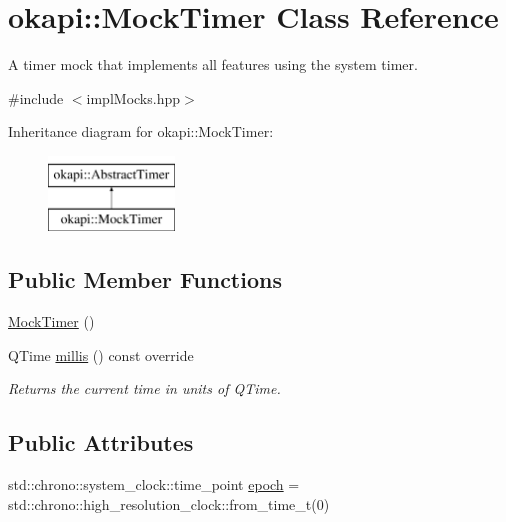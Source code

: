 \hypertarget{classokapi_1_1MockTimer}{}\section{okapi\+::Mock\+Timer Class Reference}
\label{classokapi_1_1MockTimer}


A timer mock that implements all features using the system timer.  




{\ttfamily \#include $<$impl\+Mocks.\+hpp$>$}

Inheritance diagram for okapi\+::Mock\+Timer\+:\begin{figure}[H]
\begin{center}
\leavevmode
\includegraphics[height=2.000000cm]{classokapi_1_1MockTimer}
\end{center}
\end{figure}
\subsection*{Public Member Functions}
\begin{DoxyCompactItemize}
\item 
\mbox{\hyperlink{classokapi_1_1MockTimer_af9912c6f000085eb60b57982da81d787}{Mock\+Timer}} ()
\item 
Q\+Time \mbox{\hyperlink{classokapi_1_1MockTimer_a8e688820e2fc7c4ec0e86bf9b837bf20}{millis}} () const override
\begin{DoxyCompactList}\small\item\em Returns the current time in units of Q\+Time. \end{DoxyCompactList}\end{DoxyCompactItemize}
\subsection*{Public Attributes}
\begin{DoxyCompactItemize}
\item 
std\+::chrono\+::system\+\_\+clock\+::time\+\_\+point \mbox{\hyperlink{classokapi_1_1MockTimer_a43cd4e080867a28c269ba1268e309e09}{epoch}} = std\+::chrono\+::high\+\_\+resolution\+\_\+clock\+::from\+\_\+time\+\_\+t(0)
\end{DoxyCompactItemize}
